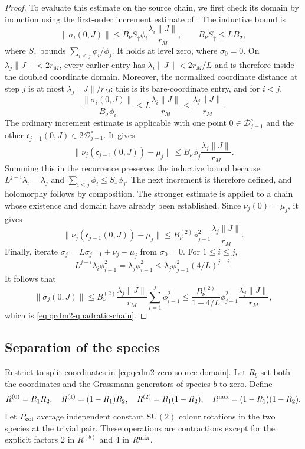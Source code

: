 \documentclass[11pt,letterpaper,reqno]{amsart}
\theoremstyle{definition}
\theoremstyle{remark}
\begin{document}
\begin{proof}
To evaluate this estimate on the source chain, we first
check its domain by induction using the first-order
increment estimate of \cite[Prop. 10.1 and Lem. 10.4]{QCDM1}.
The inductive bound is
\[
 \|\sigma_i(0,J)\|\le
 B_\nu S_\uparrow\phi_i\frac{\lambda_i\|J\|}{r_M},
 \qquad B_\nu S_\uparrow\le LB_\sigma,
\]
where $S_\uparrow$ bounds $\sum_{i\le j}\phi_i/\phi_j$.
It holds at level zero, where $\sigma_0=0$.
On $\lambda_j\|J\|<2r_M$, every earlier entry has
$\lambda_i\|J\|<2r_M/L$ and is therefore inside
the doubled coordinate domain.  Moreover, the normalized
coordinate distance at step $j$ is at most
$\lambda_j\|J\|/r_M$: this is its bare-coordinate
entry, and for $i<j$,
\[
 \frac{\|\sigma_i(0,J)\|}{B_\sigma\phi_i}
 \le L\frac{\lambda_i\|J\|}{r_M}
 \le\frac{\lambda_j\|J\|}{r_M}.
\]
The ordinary increment estimate is applicable with
one point $0\in\mathscr D_{j-1}^\circ$ and the other
$\mathfrak c_{j-1}(0,J)\in2\mathscr D_{j-1}^\circ$.
It gives
\[
 \|\nu_j(\mathfrak c_{j-1}(0,J))-\mu_j\|
       \le B_\nu\phi_j\frac{\lambda_j\|J\|}{r_M}.
\]
Summing this in the recurrence preserves the inductive bound because
$L^{j-i}\lambda_i=\lambda_j$ and
$\sum_{i\le j}\phi_i\le S_\uparrow\phi_j$.
The next increment is therefore defined, and
holomorphy follows by composition.  The stronger
estimate is applied to a chain whose existence and
domain have already been established.
Since $\nu_j(0)=\mu_j$, it gives
\[
 \|\nu_j(\mathfrak c_{j-1}(0,J))-\mu_j\|
       \le B_\nu^{(2)}\phi_{j-1}^2
                           \frac{\lambda_j\|J\|}{r_M}.
\]
Finally, iterate
$\sigma_j=L\sigma_{j-1}+\nu_j-\mu_j$ from $\sigma_0=0$.
For $1\le i\le j$,
\[
 L^{j-i}\lambda_i\phi_{i-1}^2
 =\lambda_j\phi_{i-1}^2
 \le\lambda_j\phi_{j-1}^2(4/L)^{j-i}.
\]
It follows that
\[
 \|\sigma_j(0,J)\|
 \le B_\nu^{(2)}\frac{\lambda_j\|J\|}{r_M}
                  \sum_{i=1}^j\phi_{i-1}^2
 \le\frac{B_\nu^{(2)}}{1-4/L}\phi_{j-1}^2
                           \frac{\lambda_j\|J\|}{r_M},
\]
which is \eqref{eq:qcdm2-quadratic-chain}.
\end{proof}

\subsection{Separation of the species}

Restrict to split coordinates in \eqref{eq:qcdm2-zero-source-domain}.
Let $R_b$ set both the coordinates and the Grassmann generators
of species $b$ to zero.  Define
\[
 R^{(0)}=R_1R_2,\quad R^{(1)}=(1-R_1)R_2,\quad
 R^{(2)}=R_1(1-R_2),\quad R^{\rm mix}=(1-R_1)(1-R_2).
\]
Let $P_{\rm col}$ average independent constant
$\mathrm{SU}(2)$ colour rotations in the two species at the
trivial pair.  These operations are contractions except for
the explicit factors $2$ in $R^{(b)}$ and $4$ in $R^{\rm mix}$.
\end{document}
